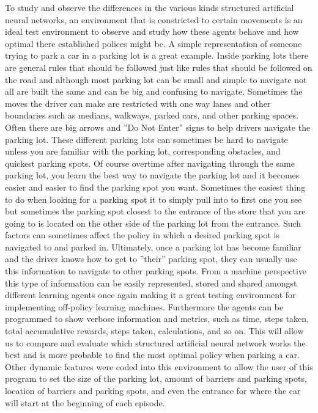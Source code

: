 \documentclass[letterpaper]{article}
\begin{document}
To study and observe the differences in the various kinds structured artificial neural networks, an environment that is constricted to certain movements is an ideal test environment to observe and study how these agents behave and how optimal there  established polices might be. A simple representation of someone trying to park a car in a parking lot is a great example. Inside parking lots there are general rules that should be followed just like rules that should be followed on the road and although most parking lot can be small and simple to navigate not all are built the same and can be big and confusing to navigate. Sometimes the moves the driver can make are restricted with one way lanes and other boundaries such as medians, walkways, parked cars, and other parking spaces. Often there are big arrows and ”Do Not Enter” signs to help drivers navigate the parking lot. These different parking lots can sometimes be hard to navigate unless you are familiar with the parking lot, corresponding obstacles, and quickest parking spots. Of course overtime after navigating through the same parking lot, you learn the best way to navigate the parking lot and it becomes easier and easier to find the parking spot you want. Sometimes the easiest thing to do when looking for a parking spot it to simply pull into to first one you see but sometimes the parking spot closest to the entrance of the store that you are going to is located on the other side of the parking lot from the entrance. Such factors can sometimes affect the policy in which a desired parking spot is navigated to and parked in. Ultimately, once a parking lot has become familiar and the driver knows how to get to ”their” parking spot, they can usually use this information to navigate to other parking spots. From a machine perspective this type of information can be easily represented, stored and
shared amongst different learning agents once again making it a great testing environment for implementing off-policy learning machines. Furthermore the agents can be programmed to show verbose information and metrics, such as time, steps taken, total accumulative rewards, steps taken, calculations, and so on.  This will allow us to compare and evaluate which structured artificial neural network works the best and is more probable to find the most optimal policy when parking a car.  Other dynamic features were coded into this environment to allow the user of this program to set the size of the parking lot, amount of barriers and parking spots, location of  barriers and parking spots, and even the entrance for where the car will start at the beginning of each episode.    
\end{document}
